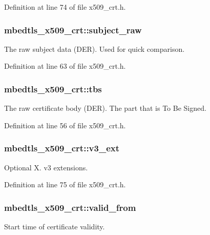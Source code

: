 Definition at line 74 of file x509\-\_\-crt.\-h.

\hypertarget{structmbedtls__x509__crt_ac30aeab20c2cdf74dae631d6d0691651}{
\subsubsection[{subject\-\_\-raw}]{ mbedtls\-\_\-x509\-\_\-crt\-::subject\-\_\-raw}}\label{structmbedtls__x509__crt_ac30aeab20c2cdf74dae631d6d0691651}
The raw subject data (D\-E\-R). Used for quick comparison. 

Definition at line 63 of file x509\-\_\-crt.\-h.

\hypertarget{structmbedtls__x509__crt_a44e9a884baad5737ef0930af94ca3f94}{
\subsubsection[{tbs}]{ mbedtls\-\_\-x509\-\_\-crt\-::tbs}}\label{structmbedtls__x509__crt_a44e9a884baad5737ef0930af94ca3f94}
The raw certificate body (D\-E\-R). The part that is To Be Signed. 

Definition at line 56 of file x509\-\_\-crt.\-h.

\hypertarget{structmbedtls__x509__crt_a6baebf9741097506a60521fbcaf5996b}{
\subsubsection[{v3\-\_\-ext}]{ mbedtls\-\_\-x509\-\_\-crt\-::v3\-\_\-ext}}\label{structmbedtls__x509__crt_a6baebf9741097506a60521fbcaf5996b}
Optional X. v3 extensions. 

Definition at line 75 of file x509\-\_\-crt.\-h.

\hypertarget{structmbedtls__x509__crt_aad3cad5d228545a1950850239741784f}{
\subsubsection[{valid\-\_\-from}]{ mbedtls\-\_\-x509\-\_\-crt\-::valid\-\_\-from}}\label{structmbedtls__x509__crt_aad3cad5d228545a1950850239741784f}
Start time of certificate validity. 

